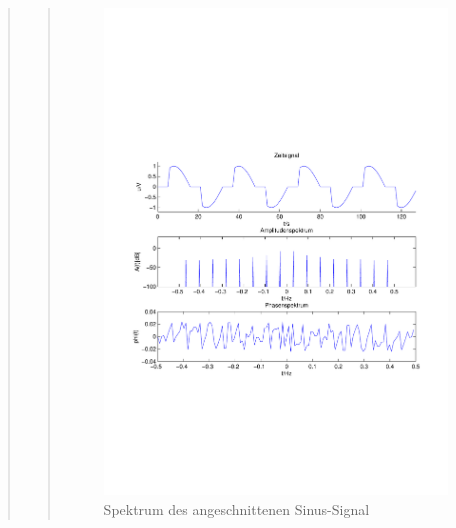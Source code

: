 \begin{quote}
\begin{quote}
        \begin{figure}[H]
                    \centering
                        \includegraphics[scale=0.5, trim = 1cm 7cm 1.5cm 8cm,
                        clip]{./Bilder/Termin8/Spektrum}
                        \caption{Spektrum des angeschnittenen Sinus-Signal}
                    \end{figure} 
        

\end{quote}
\end{quote}

